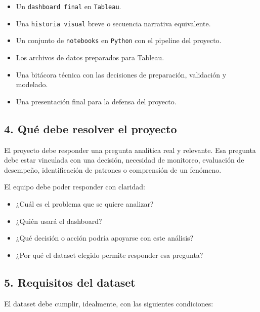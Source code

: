 \documentclass[
]{article}
\providecommand{\tightlist}{%
  \setlength{\itemsep}{0pt}\setlength{\parskip}{0pt}}
\begin{document}
\begin{itemize}
\tightlist
\item
  Un \texttt{dashboard\ final} en \texttt{Tableau}.
\item
  Una \texttt{historia\ visual} breve o secuencia narrativa equivalente.
\item
  Un conjunto de \texttt{notebooks} en \texttt{Python} con el pipeline
  del proyecto.
\item
  Los archivos de datos preparados para Tableau.
\item
  Una bitácora técnica con las decisiones de preparación, validación y
  modelado.
\item
  Una presentación final para la defensa del proyecto.
\end{itemize}

\subsection{4. Qué debe resolver el
proyecto}\label{4-quuxe9-debe-resolver-el-proyecto}

El proyecto debe responder una pregunta analítica real y relevante. Esa
pregunta debe estar vinculada con una decisión, necesidad de monitoreo,
evaluación de desempeño, identificación de patrones o comprensión de un
fenómeno.

El equipo debe poder responder con claridad:

\begin{itemize}
\tightlist
\item
  ¿Cuál es el problema que se quiere analizar?
\item
  ¿Quién usará el dashboard?
\item
  ¿Qué decisión o acción podría apoyarse con este análisis?
\item
  ¿Por qué el dataset elegido permite responder esa pregunta?
\end{itemize}

\subsection{5. Requisitos del dataset}\label{5-requisitos-del-dataset}

El dataset debe cumplir, idealmente, con las siguientes condiciones:
\end{document}
